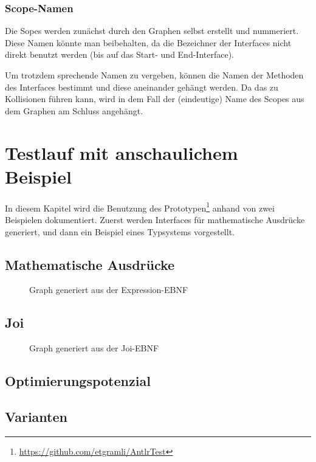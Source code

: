\documentclass[../InterneDSLs.tex]{subfiles}
\begin{document}
\subsection{Scope-Namen}
Die Sopes werden zunächst durch den Graphen selbst erstellt und nummeriert. Diese Namen könnte man beibehalten, da die Bezeichner der Interfaces nicht direkt benutzt werden (bis auf das Start- und End-Interface).

Um trotzdem sprechende Namen zu vergeben, können die Namen der Methoden des Interfaces bestimmt und diese aneinander gehängt werden. Da das zu Kollisionen führen kann, wird in dem Fall der (eindeutige) Name des Scopes aus dem Graphen am Schluss angehängt.


\chapter{Testlauf mit anschaulichem Beispiel}\label{SEC:Example}
In diesem Kapitel wird die Benutzung des Prototypen\footnote{\url{https://github.com/etgramli/AntlrTest}} anhand von zwei Beispielen dokumentiert. Zuerst werden Interfaces für mathematische Ausdrücke generiert, und dann ein Beispiel eines Typsystems vorgestellt.

\section{Mathematische Ausdrücke}
\begin{figure}
	
\end{figure}
\begin{figure}[ht]
\centering
\resizebox{\linewidth}{!}{}
\caption{Graph generiert aus der Expression-EBNF}
\label{FIG:ExprGraph}
\end{figure}

\section{Joi}
\begin{figure}[ht]
    
\end{figure}
\begin{figure}[ht]
\centering
\resizebox{0.5\linewidth}{!}{}
\caption{Graph generiert aus der Joi-EBNF}
\label{FIG:JoiGraph}
\end{figure}

\section{Optimierungspotenzial}


\section{Varianten}
\end{document}
